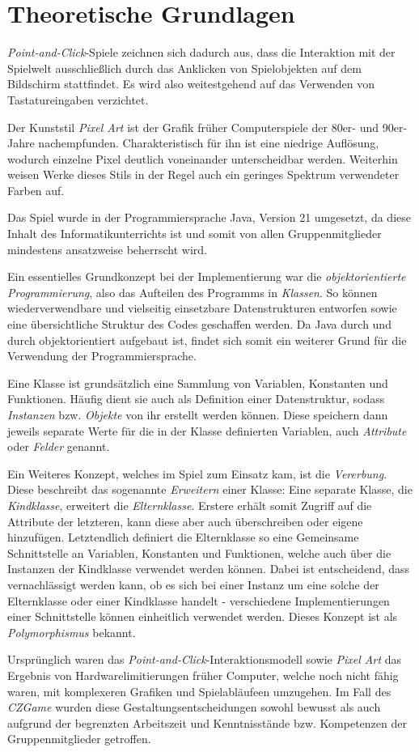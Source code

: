 \chapter{Theoretische Grundlagen}

\textit{Point-and-Click}-Spiele zeichnen sich dadurch aus, dass die Interaktion
mit der Spielwelt ausschließlich durch das Anklicken von Spielobjekten auf dem
Bildschirm stattfindet. Es wird also weitestgehend auf das Verwenden von
Tastatureingaben verzichtet.

Der Kunststil \textit{Pixel Art} ist der Grafik früher Computerspiele der
80er- und 90er-Jahre nachempfunden. Charakteristisch für ihn ist eine niedrige
Auflösung, wodurch einzelne Pixel deutlich voneinander unterscheidbar werden.
Weiterhin weisen Werke dieses Stils in der Regel auch ein geringes Spektrum
verwendeter Farben auf.

Das Spiel wurde in der Programmiersprache Java, Version 21 umgesetzt,
da diese Inhalt des Informatikunterrichts ist und somit von allen Gruppenmitglieder mindestens
ansatzweise beherrscht wird.

Ein essentielles Grundkonzept bei der Implementierung war die \textit{objektorientierte Programmierung},
also das Aufteilen des Programms in \textit{Klassen}. So können wiederverwendbare und vielseitig
einsetzbare Datenstrukturen entworfen sowie eine übersichtliche Struktur des Codes geschaffen werden.
Da Java durch und durch objektorientiert aufgebaut ist, findet sich somit ein weiterer Grund
für die Verwendung der Programmiersprache.

Eine Klasse ist grundsätzlich eine Sammlung von Variablen, Konstanten und Funktionen.
Häufig dient sie auch als Definition einer Datenstruktur, sodass \textit{Instanzen}
bzw. \textit{Objekte} von ihr erstellt werden können. Diese speichern dann
jeweils separate Werte für die in der Klasse definierten Variablen, auch \textit{Attribute}
oder \textit{Felder} genannt.

Ein Weiteres Konzept, welches im Spiel zum Einsatz kam, ist die \textit{Vererbung}.
Diese beschreibt das sogenannte \textit{Erweitern} einer Klasse: Eine separate
Klasse, die \textit{Kindklasse}, erweitert die \textit{Elternklasse}. Erstere
erhält somit Zugriff auf die Attribute der letzteren, kann diese aber auch
überschreiben oder eigene hinzufügen. Letztendlich definiert die Elternklasse
so eine Gemeinsame Schnittstelle an Variablen, Konstanten und Funktionen,
welche auch über die Instanzen der Kindklasse verwendet werden können. Dabei
ist entscheidend, dass vernachlässigt werden kann, ob es sich bei einer Instanz
um eine solche der Elternklasse oder einer Kindklasse handelt - verschiedene
Implementierungen einer Schnittstelle können einheitlich verwendet werden. Dieses
Konzept ist als \textit{Polymorphismus} bekannt.

Ursprünglich waren das \textit{Point-and-Click}-Interaktionsmodell sowie
\textit{Pixel Art} das Ergebnis von Hardwarelimitierungen früher Computer,
welche noch nicht fähig waren, mit komplexeren Grafiken und Spielabläufeen
umzugehen. Im Fall des \textit{CZGame} wurden diese Gestaltungsentscheidungen
sowohl bewusst als auch aufgrund der begrenzten Arbeitszeit und Kenntnisstände
bzw. Kompetenzen der Gruppenmitglieder getroffen.
